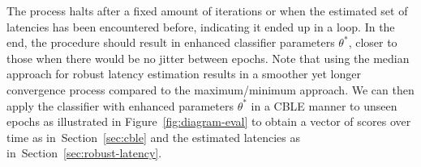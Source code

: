 The process halts after a fixed amount of iterations or when the estimated set
of latencies has been encountered before, indicating it ended up in a loop.
In the end, the procedure should result in enhanced classifier parameters $\theta^*$,
closer to those when there would be no jitter between epochs.
Note that using the median approach for robust latency estimation results in a
smoother yet longer convergence process compared to the maximum/minimum approach.
We can then apply the classifier with enhanced parameters $\theta^*$ in a CBLE
manner to unseen epochs as illustrated in Figure~\ref{fig:diagram-eval} to obtain a
vector of scores over time as in~Section~\ref{sec:cble} and the estimated latencies as
in~Section~\ref{sec:robust-latency}.
